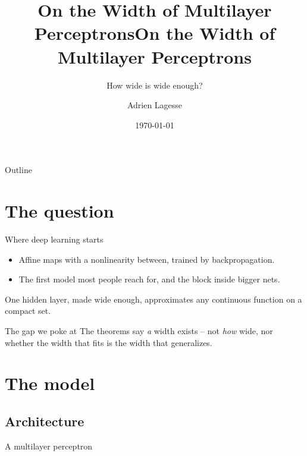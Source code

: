 \documentclass[aspectratio=169]{beamer}
\title{On the Width of Multilayer Perceptrons}
\subtitle{How wide is wide enough?}
\author{Adrien Lagesse}
\institute{INRIA Paris \& ENS Ulm}
\date{\today}
\title[On the Width of MLPs]{On the Width of Multilayer Perceptrons}
\begin{document}
\begin{frame}
  \titlepage
\end{frame}

\begin{frame}{Outline}
  \tableofcontents
\end{frame}

\section{The question}

\begin{frame}{Where deep learning starts}
  \begin{itemize}
    \item Affine maps with a nonlinearity between, trained by backpropagation.
    \item The first model most people reach for, and the block inside bigger nets.
  \end{itemize}
  \begin{theorem}
    One hidden layer, made wide enough, approximates any continuous function on
    a compact set.
  \end{theorem}
  \begin{block}{The gap we poke at}
    The theorems say \emph{a} width exists -- not \emph{how} wide, nor whether
    the width that fits is the width that generalizes.
  \end{block}
\end{frame}

\section{The model}

\subsection{Architecture}

\begin{frame}{A multilayer perceptron}
\end{frame}
\end{document}
